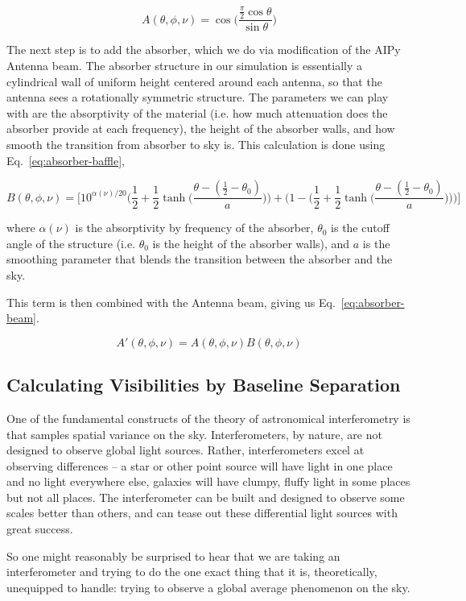 \begin{equation}
    \label{eq:dipole-beam}
    A(\theta, \phi, \nu) = \cos\Big(\frac{\frac{\pi}{2} 
    \cos{\theta}}{\sin{\theta}}\Big)
\end{equation}

The next step is to add the absorber, which we do via modification of the AIPy 
Antenna beam. The absorber structure in our simulation is essentially a 
cylindrical wall of uniform height centered around each antenna, so that the 
antenna sees a rotationally symmetric structure. The parameters we can play 
with are the absorptivity of the material (i.e. how much attenuation does the 
absorber provide at each frequency), the height of the absorber walls, and how 
smooth the transition from absorber to sky is. This calculation is done using 
Eq.~\eqref{eq:absorber-baffle},

\begin{equation}
    \label{eq:absorber-baffle}
    B(\theta, \phi, \nu) = \Big[10^{\alpha(\nu)/20} \Big(\frac{1}{2} + 
    \frac{1}{2} \tanh\Big(\frac{\theta - (\frac{1}{2} - 
    \theta_{0})}{a}\Big)\Big) + \Big(1 - \Big(\frac{1}{2} + \frac{1}{2} 
    \tanh\Big(\frac{\theta - (\frac{1}{2} - \theta_{0})}{a}\Big)\Big)\Big)\Big]
\end{equation}

where $\alpha(\nu)$ is the absorptivity by frequency of the absorber, 
$\theta_0$ is the cutoff angle of the structure (i.e. $\theta_0$ is the height 
of the absorber walls), and $a$ is the smoothing parameter that blends the 
transition between the absorber and the sky.

This term is then combined with the Antenna beam, giving us 
Eq.~\eqref{eq:absorber-beam}.

\begin{equation}
    \label{eq:absorber-beam}
    A'(\theta, \phi, \nu) = A(\theta, \phi, \nu) B(\theta, \phi, \nu)
\end{equation}

\subsection{Calculating Visibilities by Baseline Separation}

One of the fundamental constructs of the theory of astronomical interferometry 
is that samples spatial variance on the sky. Interferometers, by nature, are 
not designed to observe global light sources. Rather, interferometers excel at 
observing differences -- a star or other point source will have light in one 
place and no light everywhere else, galaxies will have clumpy, fluffy light in 
some places but not all places. The interferometer can be built and designed to 
observe some scales better than others, and can tease out these differential 
light sources with great success.

So one might reasonably be surprised to hear that we are taking an 
interferometer and trying to do the one exact thing that it is, theoretically, 
unequipped to handle: trying to observe a global average phenomenon on the sky.


